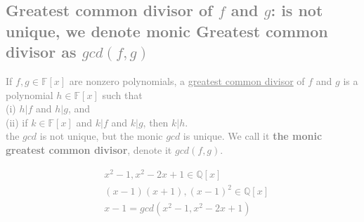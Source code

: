 \documentclass[11pt]{elegantbook}
\begin{document}
\textcolor{gray}{
\subsection{Greatest common divisor of $f$ and $g$: is not unique, we denote monic Greatest common divisor as $gcd(f,g)$}
If $f, g \in \mathbb{F}[x]$ are nonzero polynomials, a \underline{greatest common divisor} of $f$ and $g$ is a polynomial $h \in \mathbb{F}[x]$ such that\\
(i) $h|f$ and $h|g$, and\\
(ii) if $k\in\mathbb{F}[x]$ and $k|f$ and $k|g$, then $k|h$.\\
the $gcd$ is not unique, but the monic $gcd$ is unique. We call it \textbf{the monic greatest common divisor}, denote it $gcd(f,g)$.
\begin{example}
\begin{equation}
    \begin{aligned}
        &x^2 - 1, x^2 - 2x + 1 \in \mathbb{Q}[x]\\
        &(x - 1)(x + 1), (x - 1)^2 \in \mathbb{Q}[x]\\
        &x -1 = gcd(x^2 - 1, x^2 - 2x + 1)
    \end{aligned}
    \nonumber
\end{equation}
\end{example}
}
\end{document}
